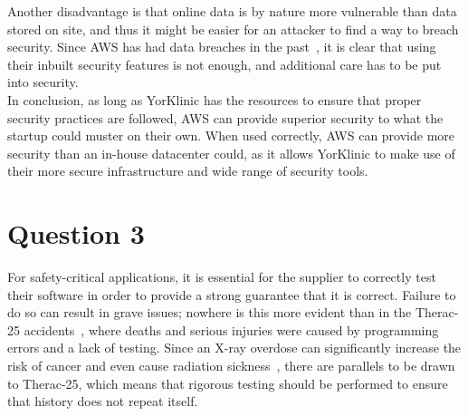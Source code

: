 \documentclass[12pt]{report}
\begin{document}
Another disadvantage is that online data is by nature more vulnerable than data stored on site, and thus it might be easier for an attacker to find a way to breach security. Since AWS has had data breaches in the past~\cite{breach}, it is clear that using their inbuilt security features is not enough, and additional care has to be put into security.\\

In conclusion, as long as YorKlinic has the resources to ensure that proper security practices are followed, AWS can provide superior security to what the startup could muster on their own. When used correctly, AWS can provide more security than an in-house datacenter could, as it allows YorKlinic to make use of their more secure infrastructure and wide range of security tools.

\section*{Question 3}

For safety-critical applications, it is essential for the supplier to correctly test their software in order to provide a strong guarantee that it is correct. Failure to do so can result in grave issues; nowhere is this more evident than in the Therac-25 accidents~\cite{therac}, where deaths and serious injuries were caused by programming errors and a lack of testing. Since an X-ray overdose can significantly increase the risk of cancer and even cause radiation sickness~\cite{rad}, there are parallels to be drawn to Therac-25, which means that rigorous testing should be performed to ensure that history does not repeat itself.
\end{document}
